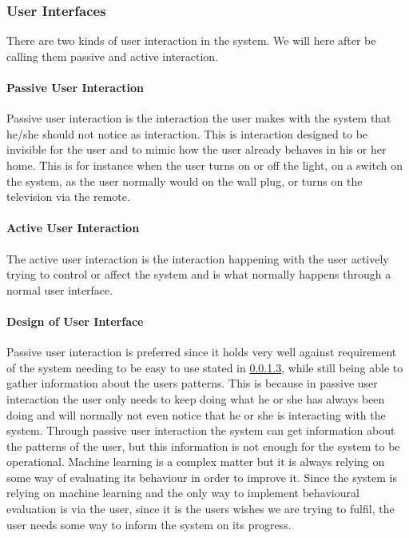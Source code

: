 \subsubsection{User Interfaces}
There are two kinds of user interaction in the system. We will here after be calling them passive and active interaction.

\paragraph{Passive User Interaction}
Passive user interaction is the interaction the user makes with the system that he/she should not notice as interaction. This is interaction designed to be invisible for the user and to mimic how the user already behaves in his or her home. This is for instance when the user turns on or off the light, on a switch on the system, as the user normally would on the wall plug, or turns on the television via the remote.

\paragraph{Active User Interaction}
The active user interaction is the interaction happening with the user actively trying to control or affect the system and is what normally happens through a normal user interface.

\paragraph{Design of User Interface}
Passive user interaction is preferred since it holds very well against requirement of the system needing to be easy to use stated in \cref{}, while still being able to gather information about the users patterns. This is because in passive user interaction the user only needs to keep doing what he or she has always been doing and will normally not even notice that he or she is interacting with the system. Through passive user interaction the system can get information about the patterns of the user, but this information is not enough for the system to be operational. Machine learning is a complex matter but it is always relying on some way of evaluating its behaviour in order to improve it. Since the system is relying on machine learning and the only way to implement behavioural evaluation is via the user, since it is the users wishes we are trying to fulfil, the user needs some way to inform the system on its progress.


